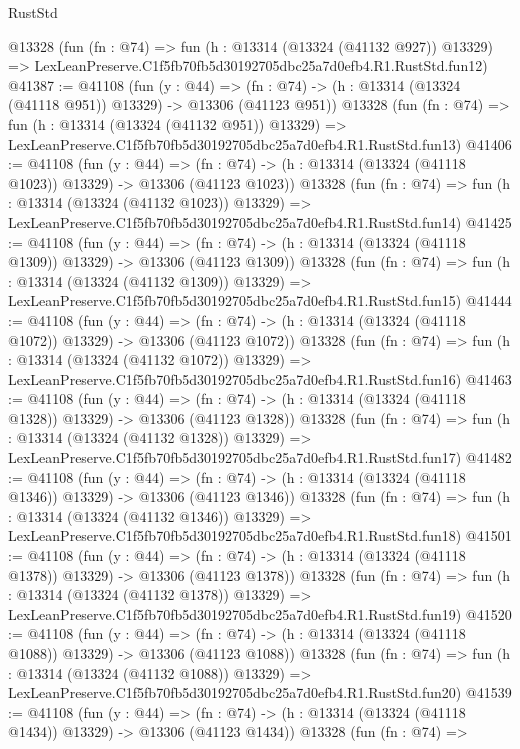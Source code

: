 \begin{lexlean}{RustStd}
\begin{coremodule}
    @13328
    (fun (fn : @74) =>
    fun (h : @13314 (@13324 (@41132 @927)) @13329) =>
    LexLeanPreserve.C1f5fb70fb5d30192705dbc25a7d0efb4.R1.RustStd.fun12)
@41387 := @41108
    (fun (y : @44) =>
    (fn : @74) -> (h : @13314 (@13324 (@41118 @951)) @13329) -> @13306 (@41123 @951))
    @13328
    (fun (fn : @74) =>
    fun (h : @13314 (@13324 (@41132 @951)) @13329) =>
    LexLeanPreserve.C1f5fb70fb5d30192705dbc25a7d0efb4.R1.RustStd.fun13)
@41406 := @41108
    (fun (y : @44) =>
    (fn : @74) -> (h : @13314 (@13324 (@41118 @1023)) @13329) -> @13306 (@41123 @1023))
    @13328
    (fun (fn : @74) =>
    fun (h : @13314 (@13324 (@41132 @1023)) @13329) =>
    LexLeanPreserve.C1f5fb70fb5d30192705dbc25a7d0efb4.R1.RustStd.fun14)
@41425 := @41108
    (fun (y : @44) =>
    (fn : @74) -> (h : @13314 (@13324 (@41118 @1309)) @13329) -> @13306 (@41123 @1309))
    @13328
    (fun (fn : @74) =>
    fun (h : @13314 (@13324 (@41132 @1309)) @13329) =>
    LexLeanPreserve.C1f5fb70fb5d30192705dbc25a7d0efb4.R1.RustStd.fun15)
@41444 := @41108
    (fun (y : @44) =>
    (fn : @74) -> (h : @13314 (@13324 (@41118 @1072)) @13329) -> @13306 (@41123 @1072))
    @13328
    (fun (fn : @74) =>
    fun (h : @13314 (@13324 (@41132 @1072)) @13329) =>
    LexLeanPreserve.C1f5fb70fb5d30192705dbc25a7d0efb4.R1.RustStd.fun16)
@41463 := @41108
    (fun (y : @44) =>
    (fn : @74) -> (h : @13314 (@13324 (@41118 @1328)) @13329) -> @13306 (@41123 @1328))
    @13328
    (fun (fn : @74) =>
    fun (h : @13314 (@13324 (@41132 @1328)) @13329) =>
    LexLeanPreserve.C1f5fb70fb5d30192705dbc25a7d0efb4.R1.RustStd.fun17)
@41482 := @41108
    (fun (y : @44) =>
    (fn : @74) -> (h : @13314 (@13324 (@41118 @1346)) @13329) -> @13306 (@41123 @1346))
    @13328
    (fun (fn : @74) =>
    fun (h : @13314 (@13324 (@41132 @1346)) @13329) =>
    LexLeanPreserve.C1f5fb70fb5d30192705dbc25a7d0efb4.R1.RustStd.fun18)
@41501 := @41108
    (fun (y : @44) =>
    (fn : @74) -> (h : @13314 (@13324 (@41118 @1378)) @13329) -> @13306 (@41123 @1378))
    @13328
    (fun (fn : @74) =>
    fun (h : @13314 (@13324 (@41132 @1378)) @13329) =>
    LexLeanPreserve.C1f5fb70fb5d30192705dbc25a7d0efb4.R1.RustStd.fun19)
@41520 := @41108
    (fun (y : @44) =>
    (fn : @74) -> (h : @13314 (@13324 (@41118 @1088)) @13329) -> @13306 (@41123 @1088))
    @13328
    (fun (fn : @74) =>
    fun (h : @13314 (@13324 (@41132 @1088)) @13329) =>
    LexLeanPreserve.C1f5fb70fb5d30192705dbc25a7d0efb4.R1.RustStd.fun20)
@41539 := @41108
    (fun (y : @44) =>
    (fn : @74) -> (h : @13314 (@13324 (@41118 @1434)) @13329) -> @13306 (@41123 @1434))
    @13328
    (fun (fn : @74) =>

\end{coremodule}
\end{lexlean}
